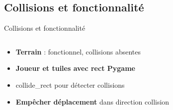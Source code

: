 \documentclass[aspectratio=169]{beamer}
\begin{document}
\subsection{Collisions et fonctionnalité}

\begin{frame}{Collisions et fonctionnalité}
    \begin{columns}
        \centering
        \begin{column}{0.5\textwidth}
            \centering
            \begin{itemize}
                \item \textbf{Terrain} : fonctionnel, collisions absentes\\
                \item \textbf{Joueur et tuiles avec rect Pygame}\\
                \item collide\_rect pour détecter collisions
                \item \textbf{Empêcher déplacement} dans direction collision\\
                

\end{itemize}
\end{column}
\end{columns}
\end{frame}
\end{document}
